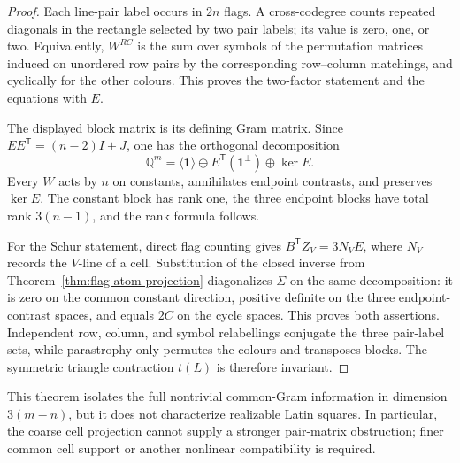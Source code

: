 \begin{proof}
Each line-pair label occurs in $2n$ flags.  A cross-codegree counts repeated
diagonals in the rectangle selected by two pair labels; its value is zero,
one, or two.  Equivalently, $W^{RC}$ is the sum over symbols of the
permutation matrices induced on unordered row pairs by the corresponding
row--column matchings, and cyclically for the other colours.  This proves the
two-factor statement and the equations with $E$.

The displayed block matrix is its defining Gram matrix.  Since
$EE^{\mathsf T}=(n-2)I+J$, one has the orthogonal decomposition
\[
 \mathbb Q^m=\langle\mathbf1\rangle\oplus
 E^{\mathsf T}(\mathbf1^\perp)\oplus\ker E.
\]
Every $W$ acts by $n$ on constants, annihilates endpoint contrasts, and
preserves $\ker E$.  The constant block has rank one, the three endpoint
blocks have total rank $3(n-1)$, and the rank formula follows.

For the Schur statement, direct flag counting gives
$B^{\mathsf T}Z_V=3N_VE$, where $N_V$ records the $V$-line of a cell.
Substitution of the closed inverse from
Theorem~\ref{thm:flag-atom-projection} diagonalizes $\Sigma$ on the same
decomposition: it is zero on the common constant direction, positive
definite on the three endpoint-contrast spaces, and equals $2C$ on the
cycle spaces.  This proves both assertions.  Independent row, column, and
symbol relabellings conjugate the three pair-label sets, while parastrophy
only permutes the colours and transposes blocks.  The symmetric triangle
contraction $t(L)$ is therefore invariant.
\end{proof}

This theorem isolates the full nontrivial common-Gram information in
dimension $3(m-n)$, but it does not characterize realizable Latin squares.
In particular, the coarse cell projection cannot supply a stronger
pair-matrix obstruction; finer common cell support or another nonlinear
compatibility is required.

